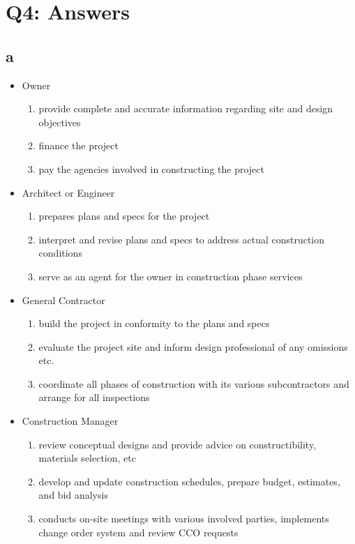 \documentclass[12pt]{article} %
\begin{document}
\section{Q4: Answers}
	
	\subsection{a}
		\begin{itemize}
			\item Owner
				\begin{enumerate}
					\item provide complete and accurate information regarding site and design objectives
					\item finance the project 
					\item pay the agencies involved in constructing the project
				\end{enumerate}
			\item Architect or Engineer
				\begin{enumerate}
					\item prepares plans and specs for the project
					\item interpret and revise plans and specs to address actual construction conditions
					\item serve as an agent for the owner in construction phase services
				\end{enumerate}
			\item General Contractor
				\begin{enumerate}
					\item build the project in conformity to the plans and specs
					\item evaluate the project site and inform design professional of any omissions etc.
					\item coordinate all phases of construction with its various subcontractors and arrange for all inspections
				\end{enumerate}
			\item Construction Manager
				\begin{enumerate}
					\item review conceptual designs and provide advice on constructibility, materials selection, etc
					\item develop and update construction schedules, prepare budget, estimates, and bid analysis
					\item conducts on-site meetings with various involved parties, implements change order system and review CCO requests
				\end{enumerate}
		\end{itemize}
\end{document}

